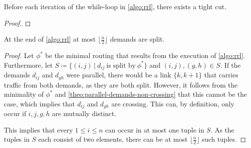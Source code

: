 \begin{invariant}
	Before each iteration of the while-loop in \cref{algo:rrl}, there exists a tight cut.
\end{invariant}
\begin{proof}
	
\end{proof}


\begin{lemma}
	\label{lemma:number-of-split-demands}
	At the end of \cref{algo:rrl} at most $\lfloor\frac{n}{2}\rfloor$ demands are split.
\end{lemma}
\begin{proof}
	Let $\phi^\ast$ be the minimal routing that results from the execution of \cref{algo:rrl}.
	Furthermore, let $S \coloneqq \{(i, j)\ |\ d_{ij}\ \text{is split by}\ \phi^\ast \}$ and $(i, j), (g, h) \in S$.
	If the demands $d_{ij}$ and $d_{gh}$ were parallel, there would be a link $\{k, k+1\}$ that carries traffic from both demands, as they are both split.
	However, it follows from the minimality of $\phi^\ast$ and \cref{theo:parallel-demands-non-crossing} that this cannot be the case, which implies that $d_{ij}$ and $d_{gh}$ are crossing.
	This can, by definition, only occur if $i, j, g, h$ are mutually distinct.
	
	This implies that every $1 \leq i \leq n$ can occur in at most one tuple in $S$.
	As the tuples in $S$ each consist of two elements, there can be at most $\lfloor\frac{n}{2}\rfloor$ such tuples.
\end{proof}